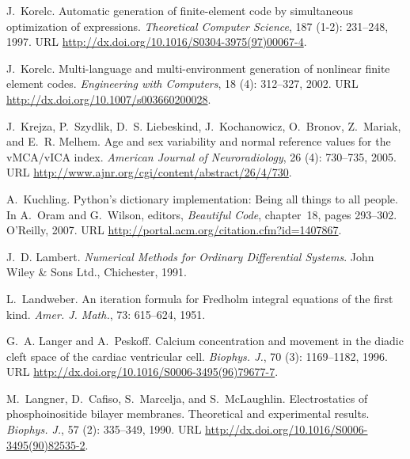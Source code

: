 \begin{thebibliography}{467}
J.~Korelc.
\newblock Automatic generation of finite-element code by simultaneous
  optimization of expressions.
\newblock \emph{Theoretical Computer Science}, 187 (1-2):
  231--248, 1997.
\newblock URL \url{http://dx.doi.org/10.1016/S0304-3975(97)00067-4}.

J.~Korelc.
\newblock Multi-language and multi-environment generation of nonlinear finite
  element codes.
\newblock \emph{Engineering with Computers}, 18 (4):
  312--327, 2002.
\newblock URL \url{http://dx.doi.org/10.1007/s003660200028}.

J.~Krejza, P.~Szydlik, D.~S. Liebeskind, J.~Kochanowicz, O.~Bronov, Z.~Mariak,
  and E.~R. Melhem.
\newblock Age and sex variability and normal reference values for the
  {vMCA/vICA} index.
\newblock \emph{American Journal of Neuroradiology}, 26 (4):
  730--735, 2005.
\newblock URL \url{http://www.ajnr.org/cgi/content/abstract/26/4/730}.

A.~Kuchling.
\newblock Python's dictionary implementation: Being all things to all people.
\newblock In A.~Oram and G.~Wilson, editors, \emph{Beautiful Code}, chapter~18,
  pages 293--302. O'Reilly, 2007.
\newblock URL \url{http://portal.acm.org/citation.cfm?id=1407867}.

J.~D. Lambert.
\newblock \emph{Numerical Methods for Ordinary Differential Systems}.
\newblock John Wiley \& Sons Ltd., Chichester, 1991.

L.~Landweber.
\newblock An iteration formula for {F}redholm integral equations of the first
  kind.
\newblock \emph{Amer. J. Math.}, 73: 615--624, 1951.

G.~A. Langer and A.~Peskoff.
\newblock Calcium concentration and movement in the diadic cleft space of the
  cardiac ventricular cell.
\newblock \emph{Biophys. J.}, 70 (3): 1169--1182, 1996.
\newblock URL \url{http://dx.doi.org/10.1016/S0006-3495(96)79677-7}.

M.~Langner, D.~Cafiso, S.~Marcelja, and S.~McLaughlin.
\newblock Electrostatics of phosphoinositide bilayer membranes. {T}heoretical
  and experimental results.
\newblock \emph{Biophys. J.}, 57 (2): 335--349, 1990.
\newblock URL \url{http://dx.doi.org/10.1016/S0006-3495(90)82535-2}.


\end{thebibliography}
